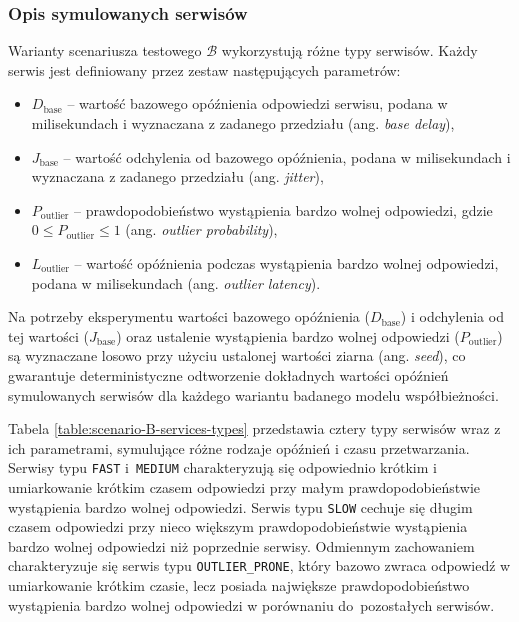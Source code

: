 \subsubsection{Opis symulowanych serwisów}
Warianty scenariusza testowego $\mathcal{B}$ wykorzystują różne typy serwisów. Każdy serwis jest definiowany przez zestaw następujących parametrów:
\begin{itemize}
    \itemsep0em
    \item $D_{\text{base}}$ -- wartość bazowego opóźnienia odpowiedzi serwisu, podana w milisekundach i wyznaczana z zadanego przedziału (ang. \emph{base delay}),
    \item $J_{\text{base}}$ -- wartość odchylenia od bazowego opóźnienia, podana w milisekundach i wyznaczana z zadanego przedziału (ang. \emph{jitter}),
    \item $P_{\text{outlier}}$ -- prawdopodobieństwo wystąpienia bardzo wolnej odpowiedzi, gdzie $0 \leqslant P_{\text{outlier}} \leqslant 1$ (ang. \emph{outlier probability}),
    \item $L_{\text{outlier}}$ -- wartość opóźnienia podczas wystąpienia bardzo wolnej odpowiedzi, podana w milisekundach (ang. \emph{outlier latency}).
\end{itemize}
Na potrzeby eksperymentu wartości bazowego opóźnienia ($D_{\text{base}}$) i odchylenia od tej wartości ($J_{\text{base}}$) oraz ustalenie wystąpienia bardzo wolnej odpowiedzi ($P_{\text{outlier}}$) są wyznaczane losowo przy użyciu ustalonej wartości ziarna (ang. \emph{seed}), co gwarantuje deterministyczne odtworzenie dokładnych wartości opóźnień symulowanych serwisów dla każdego wariantu badanego modelu współbieżności.

Tabela \ref{table:scenario-B-services-types} przedstawia cztery typy serwisów wraz z ich parametrami, symulujące różne rodzaje opóźnień i czasu przetwarzania. Serwisy typu \texttt{FAST} i~\texttt{MEDIUM} charakteryzują się odpowiednio krótkim i umiarkowanie krótkim czasem odpowiedzi przy małym prawdopodobieństwie wystąpienia bardzo wolnej odpowiedzi. Serwis typu \texttt{SLOW} cechuje się długim czasem odpowiedzi przy nieco większym prawdopodobieństwie wystąpienia bardzo wolnej odpowiedzi niż poprzednie serwisy. Odmiennym zachowaniem charakteryzuje się serwis typu \texttt{OUTLIER\_PRONE}, który bazowo zwraca odpowiedź w umiarkowanie krótkim czasie, lecz posiada największe prawdopodobieństwo wystąpienia bardzo wolnej odpowiedzi w porównaniu do~pozostałych serwisów.

